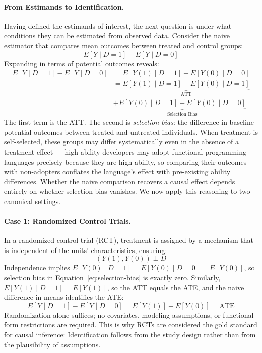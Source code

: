\paragraph{From Estimands to Identification.}
Having defined the estimands of interest, the next question is under what conditions they can be estimated from observed data.
Consider the naive estimator that compares mean outcomes between treated and control groups:
\begin{equation}
    E[Y \mid D=1] - E[Y \mid D=0]
\end{equation}
Expanding in terms of potential outcomes reveals:
\begin{align}
    E[Y \mid D=1] - E[Y \mid D=0] &= E[Y(1) \mid D=1] - E[Y(0) \mid D=0] \nonumber\\
    &= \underbrace{E[Y(1) \mid D=1] - E[Y(0) \mid D=1]}_{\text{ATT}} \\&+ \underbrace{E[Y(0) \mid D=1] - E[Y(0) \mid D=0]}_{\text{Selection Bias}}
    \label{eq:selection-bias}
\end{align}
The first term is the ATT.
The second is \emph{selection bias}: the difference in baseline potential outcomes between treated and untreated individuals.
When treatment is self-selected, these groups may differ systematically even in the absence of a treatment effect — high-ability developers may adopt functional programming languages precisely because they are high-ability, so comparing their outcomes with non-adopters conflates the language's effect with pre-existing ability differences.
Whether the naive comparison recovers a causal effect depends entirely on whether selection bias vanishes.
We now apply this reasoning to two canonical settings.

\paragraph{Case 1: Randomized Control Trials.}
In a randomized control trial (RCT), treatment is assigned by a mechanism that is independent of the units' characteristics, ensuring:
\begin{equation}
    (Y(1), Y(0)) \perp D
    \label{eq:rct-independence}
\end{equation}
Independence implies $E[Y(0) \mid D=1] = E[Y(0) \mid D=0] = E[Y(0)]$, so selection bias in Equation~\eqref{eq:selection-bias} is exactly zero.
Similarly, $E[Y(1) \mid D=1] = E[Y(1)]$, so the ATT equals the ATE, and the naive difference in means identifies the ATE:
\begin{equation}
    E[Y \mid D=1] - E[Y \mid D=0] = E[Y(1)] - E[Y(0)] = \text{ATE}
\end{equation}
Randomization alone suffices; no covariates, modeling assumptions, or functional-form restrictions are required.
This is why RCTs are considered the gold standard for causal inference: Identification follows from the study design rather than from the plausibility of assumptions.

